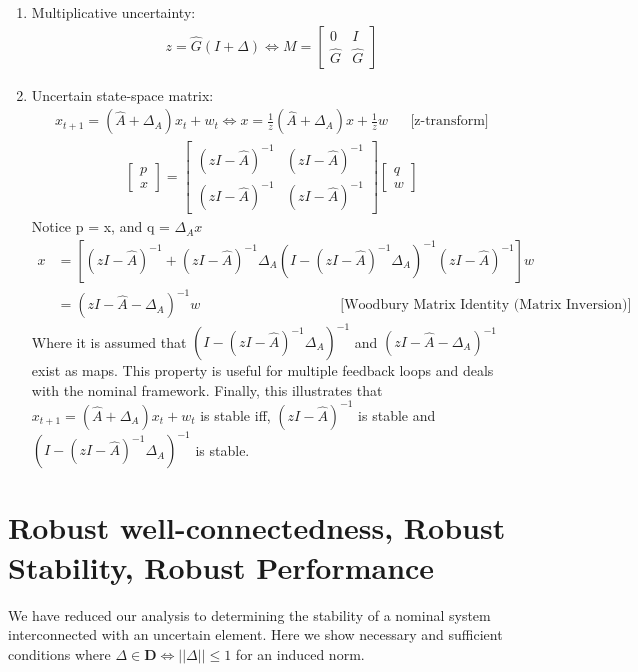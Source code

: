 \documentclass{article}[12pt]
\def\x{\mathbf{x}}
\newcommand{\norm}[1]{\left|\left|#1\right|\right|}
\begin{document}
\begin{enumerate}
    \item Multiplicative uncertainty:
    \begin{align*}
        z = \hat{G}(I + \Delta) \Longleftrightarrow M = \begin{bmatrix}0& I\\\hat{G} & \hat{G}\end{bmatrix}
    \end{align*}
    \item Uncertain state-space matrix:
    \begin{align*}
        x_{t+1} = (\hat{A} + \Delta_A)x_t + w_t \Longleftrightarrow x = \frac{1}{z}(\hat{A} + \Delta_A)x + \frac{1}{z}w && \text{[z-transform]}
    \end{align*}
    \begin{align*}
        \begin{bmatrix}p\\x\end{bmatrix} = \begin{bmatrix}(zI-\hat{A})^{-1}&(zI-\hat{A})^{-1}\\(zI-\hat{A})^{-1}&(zI-\hat{A})^{-1}\end{bmatrix}\begin{bmatrix}q\\w\end{bmatrix}
    \end{align*}
    Notice p = x, and q = $\Delta_A x$
    \begin{align*}
        x &= [(zI-\hat{A})^{-1} + (zI-\hat{A})^{-1}\Delta_A(I - (zI-\hat{A})^{-1} \Delta_A)^{-1}(zI-\hat{A})^{-1}]w\\
        &= (zI-\hat{A} - \Delta_A)^{-1}w \qquad \qquad \qquad \qquad \qquad \text{[Woodbury Matrix Identity (Matrix Inversion)]}
    \end{align*}
    Where it is assumed that $(I - (zI-\hat{A})^{-1}\Delta_A)^{-1}$ and $(zI-\hat{A} - \Delta_A)^{-1}$ exist as maps. This property is useful for multiple feedback loops and deals with the nominal framework. Finally, this illustrates that $ x_{t+1} = (\hat{A} + \Delta_A)x_t + w_t$ is stable iff, $(zI-\hat{A})^{-1}$ is stable and $(I - (zI-\hat{A})^{-1}\Delta_A)^{-1}$ is stable.
\end{enumerate}

\section{Robust well-connectedness, Robust Stability, Robust Performance}
We have reduced our analysis to determining the stability of a nominal system interconnected with an uncertain element. Here we show necessary and sufficient conditions where $\Delta \in \textbf{D} \Longleftrightarrow \norm{\Delta}\leq 1$ for an induced norm.
\end{document}

